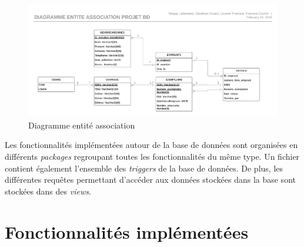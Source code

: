 \documentclass[11pt,a4paper]{article}
\begin{document}
\begin{landscape}
    \begin{figure}[h]
        \centering
        \includegraphics[width=26cm]{img/Diagramme_entite_association_db.png}
        \caption{Diagramme entité association}
        \label{fig:diag}
    \end{figure}
\end{landscape}
Les fonctionnalités implémentées autour de la base de données sont organisées en différents \textit{packages} regroupant toutes les fonctionnalités du même type. Un fichier contient également l'ensemble des \textit{triggers} de la base de données. De plus, les différentes requêtes permettant d'accéder aux données stockées dans la base sont stockées dans des \textit{views}.
\section{Fonctionnalités implémentées}
\end{document}
